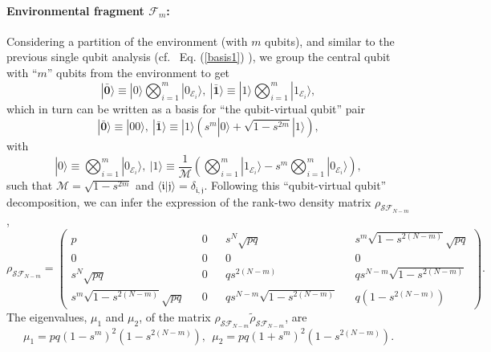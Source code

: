 \documentclass[aps,prl,showpacs,amsmath,amssymb,amsfonts,lengthcheck,onecolumn,longbibliography,superscriptaddress]{revtex4-2}
\newcommand\myeqref[1]{
	Eq. (\textup{\ref{#1}})
}
\newcommand{\thickbar}[1]{\mathbf{\bar{\text{$#1$}}}}
\newcommand{\cE}        {{\mathcal E}}
\newcommand{\+}         {\dagger}
\newcommand{\mc}[1]{\mathcal{#1}}
\begin{document}
\paragraph{Environmental fragment $\mc{F}_m$:}
Considering a partition of the environment (with $m$ qubits), and similar to the previous single qubit analysis (cf.~\myeqref{basis1}), we group the central qubit with ``$m$'' qubits from the environment to get
\begin{equation}
	| \thickbar{0} \rangle \equiv|0\rangle \bigotimes_{i=1}^{m} | 0_{\cE_{i}} \rangle,\ | \thickbar{1} \rangle \equiv |1\rangle \bigotimes_{i=1}^{m} |  1_{\cE_{i}} \rangle,
\end{equation}
which in turn can be written as a basis for ``the qubit-virtual qubit'' pair
\begin{equation}
	| \thickbar{0} \rangle \equiv|0\mathfrak{0}\rangle ,\ | \thickbar{1} \rangle \equiv |1\rangle\left( s^{m}|\mathfrak{0}\rangle+\sqrt{1-s^{2m}}|\mathfrak{1}\rangle\right),
	\label{basism}
\end{equation}
with
\begin{equation}
	|\mathfrak{0} \rangle \equiv \bigotimes_{i=1}^{m} | 0_{\cE_{i}} \rangle,\  | \mathfrak{1} \rangle \equiv \frac{1}{\mc{M}}\left(\bigotimes_{i=1}^{m} |  1_{\cE_{i}} \rangle-s^{m}\bigotimes_{i=1}^{m} |  0_{\cE_{i}} \rangle\right),
\end{equation}
such that $\mc{M}=\sqrt{1-s^{2m}}$ and $\langle \mathfrak{i}|\mathfrak{j} \rangle=\delta_{\mathfrak{i},\mathfrak{j}}$. Following this ``qubit-virtual qubit'' decomposition, we can infer the expression of the rank-two density matrix $\rho_{\mc{S}\mc{F}_{N-m}}$,
\begin{equation}
	\rho_{\mc{S}\mc{F}_{N-m}}=\begin{pmatrix}
		p && 0 && s^{N}\sqrt{pq} && s^{m}\sqrt{1-s^{2(N-m)}}\sqrt{pq} \\
		0 && 0 && 0 && 0\\
		s^{N}\sqrt{pq}&& 0 &&  qs^{2(N-m)} && qs^{N-m}\sqrt{1-s^{2(N-m)}}\\
		s^{m}\sqrt{1-s^{2(N-m)}}\sqrt{pq}&& 0 && qs^{N-m}\sqrt{1-s^{2(N-m)}} && q(1-s^{2(N-m)})
	\end{pmatrix}.
\end{equation}
The eigenvalues, $\mu_1$ and $\mu_2$, of the matrix $\rho_{\mc{S}\mc{F}_{N-m}}\tilde{\rho}_{\mc{S}\mc{F}_{N-m}}$, are
\begin{equation}
	\mu_1= pq\left(1-s^{m}\right)^{2}(1-s^{2(N-m)}), \ \ \mu_2= pq\left(1+s^{m}\right)^{2}(1-s^{2(N-m)}).
\end{equation}
\end{document}
